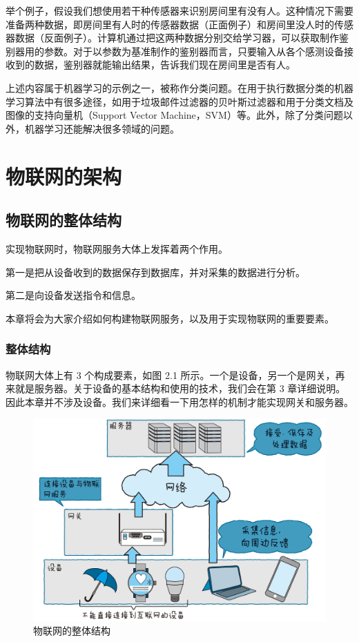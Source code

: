 \documentclass[12pt,UTF8]{ctexbook}
\begin{document}
举个例子，假设我们想使用若干种传感器来识别房间里有没有人。这种情况下需要准备两种数据，即房间里有人时的传感器数据（正面例子）和房间里没人时的传感器数据（反面例子）。计算机通过把这两种数据分别交给学习器，可以获取制作鉴别器用的参数。对于以参数为基准制作的鉴别器而言，只要输入从各个感测设备接收到的数据，鉴别器就能输出结果，告诉我们现在房间里是否有人。

上述内容属于机器学习的示例之一，被称作分类问题。在用于执行数据分类的机器学习算法中有很多途径，如用于垃圾邮件过滤器的贝叶斯过滤器和用于分类文档及图像的支持向量机（Support Vector Machine，SVM）等。此外，除了分类问题以外，机器学习还能解决很多领域的问题。

\chapter{物联网的架构}

\section{物联网的整体结构}

实现物联网时，物联网服务大体上发挥着两个作用。

第一是把从设备收到的数据保存到数据库，并对采集的数据进行分析。

第二是向设备发送指令和信息。

本章将会为大家介绍如何构建物联网服务，以及用于实现物联网的重要要素。

\subsection{整体结构}

物联网大体上有 3 个构成要素，如图 2.1 所示。一个是设备，另一个是网关，再来就是服务器。关于设备的基本结构和使用的技术，我们会在第 3 章详细说明。因此本章并不涉及设备。我们来详细看一下用怎样的机制才能实现网关和服务器。

\begin{figure}[htbp]
	\centering
	\includegraphics[width=1\linewidth]{20}
	\caption{物联网的整体结构}
	\label{fig:1}
\end{figure}
\end{document}
